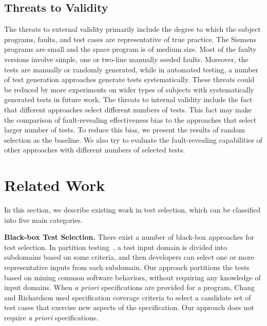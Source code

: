 \documentclass{sig-alternate}
\begin{document}
\subsection{Threats to Validity}
The threats to external validity primarily include the degree to
which the subject programs, faults, and test cases are
representative of true practice. The Siemens programs are small and
the space program is of medium size. Most of the faulty versions
involve simple, one or two-line manually seeded faults. Moreover,
the tests are manually or randomly generated, while in automated
testing, a number of test generation approaches generate tests
systematically. These threats could be reduced by more experiments
on wider types of subjects with systematically generated tests in
future work. The threats to internal validity include the fact that
different approaches select different numbers of tests. This fact
may make the comparison of fault-revealing effectiveness bias to the
approaches that select larger number of tests. To reduce this bias,
we present the results of random selection as the baseline. We also
try to evaluate the fault-revealing capabilities of other approaches
with different numbers of selected tests.



\section{Related Work} \label{sec:relatedwork}

In this section, we describe existing work in test selection, which
can be classified into five main categories.



\textbf{Black-box Test Selection.} There exist a number of
black-box approaches for test selection. In partition
testing~\cite{Myers79}, a test input domain is divided into
subdomains based on some criteria, and then developers can select
one or more representative inputs from each subdomain. Our approach
partitions the tests based on mining common software behaviors,
without requiring any knowledge of input domains. When \emph{a
priori} specifications are provided for a program, Chang and
Richardson \cite{Chang99} used specification coverage criteria to
select a candidate set of test cases that exercise new aspects of
the specification. Our approach does not require \emph{a priori}
specifications.

\end{document}
